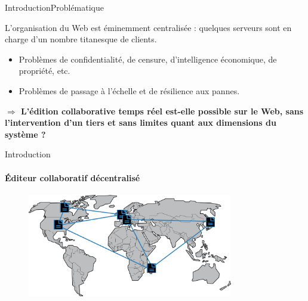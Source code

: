 \begin{frame}{Introduction}{Problématique}

  L'organisation du Web est éminemment centralisée : quelques serveurs sont en
  charge d'un nombre titanesque de clients.
  \begin{itemize}
  \item Problèmes de confidentialité, de censure, d'intelligence économique, de
    propriété, etc.
  \item Problèmes de passage à l'échelle et de résilience aux pannes.
  \end{itemize}
  
  \vspace{1cm}

  \large\textbf{$\Rightarrow$ L'édition collaborative temps réel est-elle
    possible sur le Web, sans l'intervention d'un tiers et sans limites quant
    aux dimensions du système ?}

\end{frame}


\begin{frame}{Introduction}\framesubtitle{Éditeur collaboratif décentralisé}
  \begin{figure}
    \begin{center}
      \includegraphics[width=0.8\textwidth]{img/world.png}
    \end{center}
  \end{figure}

\end{frame}


